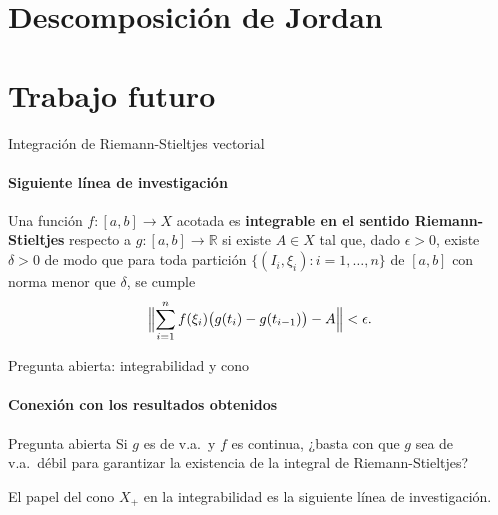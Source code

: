\documentclass{beamer}
\newcommand{\Xp}{X_{+}}               %
\begin{document}
\section{Descomposición de Jordan}






\section{Trabajo futuro}

\begin{frame}{Integración de Riemann-Stieltjes vectorial}
\framesubtitle{Siguiente línea de investigación}

\begin{definition}
Una función $f:[a,b]\to X$ acotada es \textbf{integrable en el sentido
Riemann-Stieltjes} respecto a $g:[a,b]\to\mathbb{R}$ si existe $A\in X$
tal que, dado $\epsilon>0$, existe $\delta>0$ de modo que para toda
partición $\{(I_i,\xi_i):i=1,\ldots,n\}$ de $[a,b]$ con norma menor
que $\delta$, se cumple
\[
\Bigl\|\sum_{i=1}^n f(\xi_i)\bigl(g(t_i)-g(t_{i-1})\bigr) - A\Bigr\|
< \epsilon.
\]
\end{definition}

\end{frame}


\begin{frame}{Pregunta abierta: integrabilidad y cono}
\framesubtitle{Conexión con los resultados obtenidos}

\begin{alertblock}{Pregunta abierta}
Si $g$ es de v.a.\ y $f$ es continua, ¿basta con que $g$ sea de v.a.\
débil para garantizar la existencia de la integral de Riemann-Stieltjes?

\medskip
El papel del cono $\Xp$ en la integrabilidad es la siguiente línea de
investigación.
\end{alertblock}

\end{frame}
\end{document}
